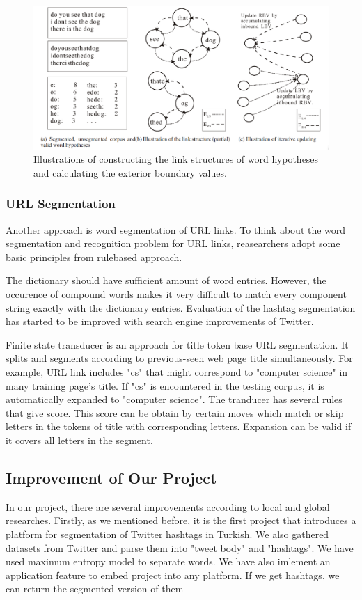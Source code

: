 \documentclass[12pt]{comjnl}
\begin{document}
\begin{figure}[htbp]
\centering
\includegraphics[width=7in]{paper3.png}
\caption{Illustrations of constructing the link structures of word hypotheses and calculating the exterior boundary values.}\label{fig:paper1}
\end{figure}

\subsubsection{URL Segmentation}
Another approach is word segmentation of URL links. To think about the word segmentation and
recognition problem for URL links, reasearchers adopt some basic principles from rule­based
approach.

The dictionary should have sufficient amount of word entries. However, the occurence
of compound words makes it very difficult to match every component string exactly with the
dictionary entries. Evaluation of the hashtag segmentation has started to be improved with search engine
improvements of Twitter.

Finite state transducer is an approach for title token base URL segmentation. It splits and segments according to previous-seen web page title simultaneously. For example, URL link includes "cs" that might correspond to "computer science" in many training page's title. If "cs" is encountered in the testing corpus, it is automatically expanded to "computer science". The tranducer has several rules that give score. This score can be obtain by certain moves which match or skip letters in the tokens of title with corresponding letters. Expansion can be valid if it covers all letters in the segment.


\subsection{Improvement of Our Project}
In our project, there are several improvements according to local and global researches. Firstly, as we mentioned before, it is the first project that introduces a platform for segmentation of Twitter hashtags in Turkish. We also gathered datasets from Twitter and parse them into "tweet body" and "hashtags". We have used maximum entropy model to separate words. We have also imlement an application feature to embed project into any platform. If we get hashtags, we can return the segmented version of them
\end{document}
